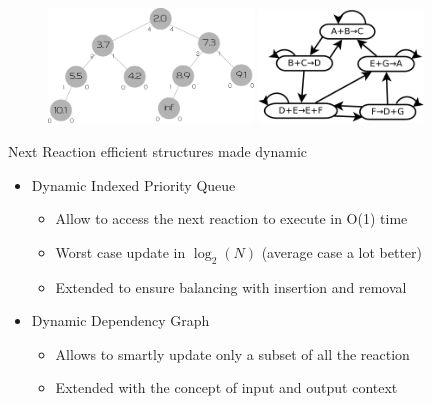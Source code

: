 \documentclass[presentation]{beamer}\mode<presentation>{\usetheme{sapere}}
\begin{document}
\begin{frame}{}
\begin{figure}[H]
  \begin{center}
    \includegraphics[width=0.485\textwidth]{imgs/extipq.pdf}
    \hspace{30pt}
    \includegraphics[width=0.39\textwidth]{imgs/dependencygraph.pdf}
    \label{img:datastruct}
  \end{center}
\end{figure}
\begin{block}{Next Reaction efficient structures made dynamic}
\begin{itemize}
 \item Dynamic Indexed Priority Queue
\begin{itemize}
 \item Allow to access the next reaction to execute in O(1) time
 \item Worst case update in $\log_2{(N)}$ (average case a lot better)
 \item Extended to ensure balancing with insertion and removal
\end{itemize}
 \item Dynamic Dependency Graph
\begin{itemize}
 \item Allows to smartly update only a subset of all the reaction
 \item Extended with the concept of input and output context
\end{itemize}
\end{itemize}
\end{block}
\end{frame}
\end{document}
